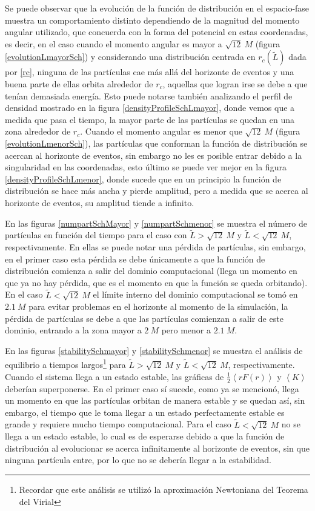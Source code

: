 \documentclass[11pt,twoside,openright,spanish]{report}
\numberwithin{equation}{chapter}
\numberwithin{figure}{chapter}
\numberwithin{table}{chapter}
\begin{document}
Se puede observar que la evolución de la función de distribución en el espacio-fase muestra un comportamiento distinto dependiendo de la magnitud del momento angular utilizado, que concuerda con la forma del potencial en estas coordenadas, es decir, en el caso cuando el momento angular es mayor a $\sqrt{12}\ M$ (figura \ref{evolutionLmayorSch}) y considerando una distribución centrada en $r_c(\tilde{L})$ dada por \eqref{rc}, ninguna de las partículas cae más allá del horizonte de eventos y una buena parte de ellas orbita alrededor de $r_c$, aquellas que logran irse se debe a que tenían demasiada energía. Esto puede notarse también analizando el perfil de densidad mostrado en la figura \ref{densityProfileSchLmayor}, donde vemos que a medida que pasa el tiempo, la mayor parte de las partículas se quedan en una zona alrededor de $r_c$. Cuando el momento angular es menor que $\sqrt{12}\ M$ (figura \ref{evolutionLmenorSch}), las partículas que conforman la función de distribución se acercan al horizonte de eventos, sin embargo no les es posible entrar debido a la singularidad en las coordenadas, esto último se puede ver mejor en la figura \ref{densityProfileSchLmenor}, donde sucede que en un principio la función de distribución se hace más ancha y pierde amplitud, pero a medida que se acerca al horizonte de eventos, su amplitud tiende a infinito.

En las figuras \ref{numpartSchMayor} y \ref{numpartSchmenor} se muestra el número de partículas en función del tiempo para el caso con $\tilde{L}>\sqrt{12}\ M$ y $\tilde{L}<\sqrt{12}\ M$, respectivamente. En ellas se puede notar una pérdida de partículas, sin embargo, en el primer caso esta pérdida se debe únicamente a que la función de distribución comienza a salir del dominio computacional (llega un momento en que ya no hay pérdida, que es el momento en que la función se queda orbitando). En el caso $\tilde{L}<\sqrt{12}\ M$ el límite interno del dominio computacional se tomó en $2.1\ M$ para evitar problemas en el horizonte al momento de la simulación, la pérdida de partículas se debe a que las partículas comienzan a salir de este dominio, entrando a la zona mayor a $2\ M$ pero menor a $2.1\ M$.

En las figuras \ref{stabilitySchmayor} y \ref{stabilitySchmenor} se muestra el análisis de equilibrio a tiempos largos\footnote{Recordar que este análisis se utilizó la aproximación Newtoniana del Teorema del Virial} para $\tilde{L}>\sqrt{12}\ M$ y $\tilde{L}<\sqrt{12}\ M$, respectivamente. Cuando el sistema llega a un estado estable, las gráficas de $\frac{1}{2}\left<rF(r)\right>$ y $\left<K\right>$ deberían superponerse. En el primer caso sí sucede, como ya se mencionó, llega un momento en que las partículas orbitan de manera estable y se quedan así, sin embargo, el tiempo que le toma llegar a un estado perfectamente estable es grande y requiere mucho tiempo computacional. Para el caso $\tilde{L}<\sqrt{12}\ M$ no se llega a un estado estable, lo cual es de esperarse debido a que la función de distribución al evolucionar se acerca infinitamente al horizonte de eventos, sin que ninguna partícula entre, por lo que no se debería llegar a la estabilidad.
\end{document}
